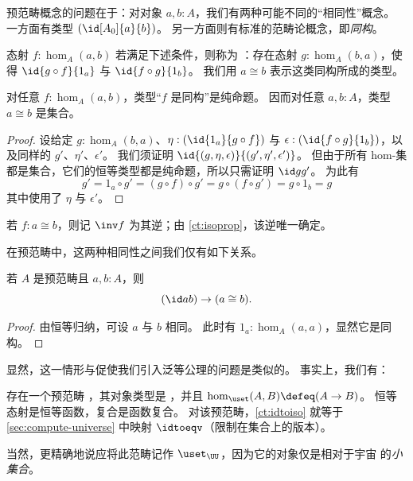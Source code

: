 预范畴概念的问题在于：对对象 $a,b:A$，我们有两种可能不同的“相同性”概念。
一方面有类型 $(\id[A_0]{a}{b})$。
另一方面则有标准的范畴论概念，即\emph{同构}。

\begin{defn}\label{ct:isomorphism}
  态射 $f:\hom_A(a,b)$ 若满足下述条件，则称为
  ：存在态射 $g:\hom_A(b,a)$，使得 $\id{g\circ f}{1_a}$ 与 $\id{f\circ g}{1_b}$。
  我们用 $a\cong b$ 表示这类同构所成的类型。
\end{defn}

\begin{lem}\label{ct:isoprop}
  对任意 $f:\hom_A(a,b)$，类型“$f$ 是同构”是纯命题。
  因而对任意 $a,b:A$，类型 $a\cong b$ 是集合。
\end{lem}
\begin{proof}
  设给定 $g:\hom_A(b,a)$、$\eta:(\id{1_a}{g\circ f})$ 与 $\epsilon:(\id{f\circ g}{1_b})$，以及同样的 $g'$、$\eta'$、$\epsilon'$。
我们须证明 $\id{(g,\eta,\epsilon)}{(g',\eta',\epsilon')}$。
  但由于所有 hom-集都是集合，它们的恒等类型都是纯命题，所以只需证明 $\id g {g'}$。
  为此有
  \[g' = 1_a\circ g' = (g\circ f)\circ g' = g\circ (f\circ g') = g\circ 1_b = g\]
  其中使用了 $\eta$ 与 $\epsilon'$。
\end{proof}

%
若 $f:a\cong b$，则记 $\inv f$ 为其逆；由 \cref{ct:isoprop}，该逆唯一确定。

在预范畴中，这两种相同性之间我们仅有如下关系。

\begin{lem}\label{ct:idtoiso}
  若 $A$ 是预范畴且 $a,b:A$，则
  \[(\id a b)\to (a \cong b).\]
\end{lem}
\begin{proof}
  由恒等归纳，可设 $a$ 与 $b$ 相同。
  此时有 $1_a:\hom_A(a,a)$，显然它是同构。
\end{proof}

显然，这一情形与促使我们引入泛等公理的问题是类似的。
事实上，我们有：

\begin{eg}\label{ct:precatset}
  存在一个预范畴 \uset，其对象类型是 \set，并且 $\hom_{\uset}(A,B) \defeq (A\to B)$。
  恒等态射是恒等函数，复合是函数复合。
  对该预范畴，\cref{ct:idtoiso} 就等于 \cref{sec:compute-universe} 中映射 $\idtoeqv$（限制在集合上的版本）。

  当然，更精确地说应将此范畴记作 $\uset_\UU$，因为它的对象仅是相对于宇宙 \UU 的\emph{小集合}。
\end{eg}

